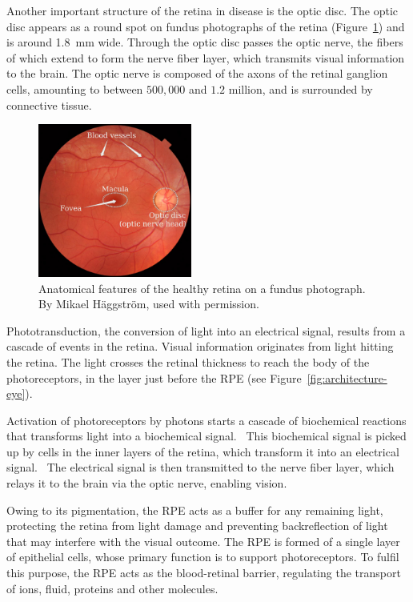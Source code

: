 \documentclass[12pt,a4paper]{journal}
\begin{document}
Another important structure of the retina in disease is the optic disc.
The optic disc appears as a round spot on fundus photographs of the retina (Figure~\ref{fig:Scans}) and is around \SI{1.8}{\mm} wide.
Through the optic disc passes the optic nerve, the fibers of which extend to form the nerve fiber layer, which transmits visual information to the brain.
The optic nerve is composed of the axons of the retinal ganglion cells, amounting to between $500,000$ and $1.2$ million, and is surrounded by connective tissue.~\cite{Salazar_2019}

\begin{figure}[ht]
  \centering
  \includegraphics[width=0.45\textwidth]{FA}
  \caption{Anatomical features of the healthy retina on a fundus photograph. By Mikael H\"aggstr\"om, used with permission.}
  \label{fig:Scans}
\end{figure}

Phototransduction, the conversion of light into an electrical signal, results from a cascade of events in the retina. 
Visual information originates from light hitting the retina.
The light crosses the retinal thickness to reach the body of the photoreceptors, in the layer just before the RPE (see Figure~\ref{fig:architecture-eye}).

Activation of photoreceptors by photons starts a cascade of biochemical reactions that transforms light into a biochemical signal.~\cite{Hurley_2009}
This biochemical signal is picked up by cells in the inner layers of the retina, which transform it into an electrical signal.~\cite{Arslan_2018}
The electrical signal is then transmitted to the nerve fiber layer, which relays it to the brain via the optic nerve, enabling vision.

Owing to its pigmentation, the RPE acts as a buffer for any remaining light, protecting the retina from light damage and preventing backreflection of light that may interfere with the visual outcome.
The RPE is formed of a single layer of epithelial cells, whose primary function is to support photoreceptors.
To fulfil this purpose, the RPE acts as the blood-retinal barrier, regulating the transport of ions, fluid, proteins and other molecules.~\cite{Boulton_2001}
\end{document}

